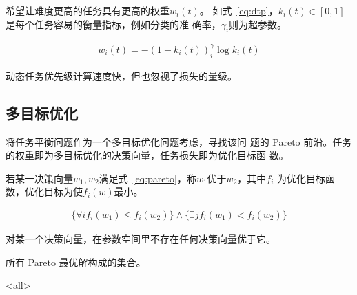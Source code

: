\documentclass[../main]{subfiles}
\begin{document}
\cite{Guo_2018_ECCV}希望让难度更高的任务具有更高的权重$w_i(t)$。
如式~\ref{eq:dtp}，$k_i(t) \in [0, 1]$是每个任务容易的衡量指标，例如分类的准
确率，$\gamma_i$则为超参数。

\begin{align}
  \label{eq:dtp}
  w_i(t) = -{(1 - k_i(t))}^\gamma_i\log k_i(t)
\end{align}

动态任务优先级计算速度快，但也忽视了损失的量级。

\subsection{多目标优化}%
\label{sub:pareto}

\cite{NEURIPS2019_685bfde0}将任务平衡问题作为一个多目标优化问题考虑，寻找该问
题的 Pareto 前沿。任务的权重即为多目标优化的决策向量，任务损失即为优化目标函
数。

\begin{definition}[Pareto 占优]
  若某一决策向量$w_1, w_2$满足式~\ref{eq:pareto}，称$w_1$优于$w_2$，其中$f_i$
  为优化目标函数，优化目标为使$f_i(w)$最小。
\end{definition}

\begin{align}
  \label{eq:pareto}
  \{\forall i f_i(w_1) \leqslant f_i(w_2)\} \land
  \{\exists j f_i(w_1) < f_i(w_2)\}
\end{align}

\begin{definition}[Pareto 最优]
  对某一个决策向量，在参数空间里不存在任何决策向量优于它。
\end{definition}

\begin{definition}[Pareto 前沿]
  所有 Pareto 最优解构成的集合。
\end{definition}

\mode<all>
\end{document}
